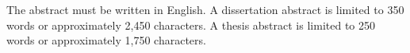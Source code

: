 




\begin{abstractpage}
The abstract must be written in English. A dissertation abstract is limited to 350 words or approximately 2,450 characters. A thesis abstract is limited to 250 words or approximately 1,750 characters.
\end{abstractpage}
